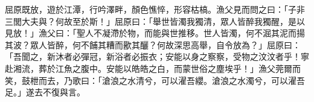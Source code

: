 
\begin{pinyinscope}
屈原既放，遊於江潭，行吟澤畔，顏色憔悴，形容枯槁。漁父見而問之曰：「子非三閭大夫與？何故至於斯！」屈原曰：「舉世皆濁我獨清，眾人皆醉我獨醒，是以見放！」漁父曰：「聖人不凝滯於物，而能與世推移。世人皆濁，何不淈其泥而揚其波？眾人皆醉，何不餔其糟而歠其釃？何故深思高舉，自令放為？」屈原曰：「吾聞之，新沐者必彈冠，新浴者必振衣；安能以身之察察，受物之汶汶者乎！寧赴湘流，葬於江魚之腹中。安能以皓皓之白，而蒙世俗之塵埃乎！」漁父莞爾而笑，鼓枻而去，乃歌曰：「滄浪之水清兮，可以濯吾纓。滄浪之水濁兮，可以濯吾足。」遂去不復與言。


\end{pinyinscope}